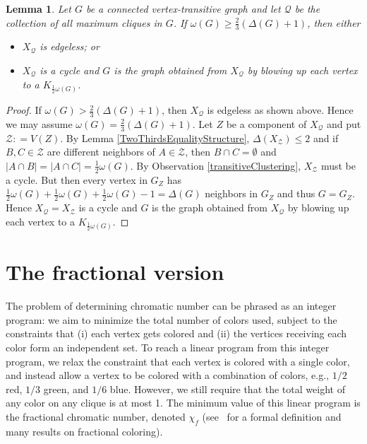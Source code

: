 \documentclass[12pt]{article}
\theoremstyle{plain}
\newtheorem{lem}[thm]{Lemma}
\theoremstyle{definition}
\theoremstyle{remark}
\newcommand{\fancy}[1]{\mathcal{#1}}
\newcommand{\card}[1]{\left|#1\right|}
\newcommand{\parens}[1]{\left( #1 \right)}
\newcommand{\DefinedAs}{\mathrel{\mathop:}=}
\def\Q{\fancy{Q}}
\def\Z{\fancy{Z}}
\begin{document}
\begin{lem}\label{TransitiveClusteringBigCliques}
Let $G$ be a connected vertex-transitive graph and let $\Q$ be the collection
of all maximum cliques in $G$.  If $\omega(G) \ge \frac23 \parens{\Delta(G) +
1}$, then either
\begin{itemize}
\item $X_\Q$ is edgeless; or
\item $X_\Q$ is a cycle and $G$ is the graph obtained from $X_\Q$ by blowing up each vertex to a $K_{\frac12 \omega(G)}$.
\end{itemize}
\end{lem}
\begin{proof}
If $\omega(G) > \frac23 \parens{\Delta(G) + 1}$, then $X_\Q$ is edgeless as shown above.  Hence we may assume $\omega(G) = \frac23 \parens{\Delta(G) + 1}$.  Let $Z$ be a component of $X_\Q$ and put $\Z \DefinedAs V(Z)$.
By Lemma \ref{TwoThirdsEqualityStructure}, $\Delta(X_\Z) \le 2$ and if $B, C \in \Z$ are different neighbors of $A \in \Z$, then $B \cap C = \emptyset$ and $\card{A \cap B} = \card{A \cap C} = \frac12 \omega(G)$.  By Observation \ref{transitiveClustering}, $X_\Z$ must be a cycle.  But then every vertex in $G_Z$ has $\frac12 \omega(G) + \frac12 \omega(G) + \frac12 \omega(G) - 1 = \Delta(G)$ neighbors in $G_Z$ and thus $G = G_Z$.  Hence $X_\Q = X_\Z$ is a cycle and $G$ is the graph obtained from $X_\Q$ by blowing up each vertex to a $K_{\frac12 \omega(G)}$.
\end{proof}

\section{The fractional version}
The problem of determining chromatic number can be phrased as an integer
program: we aim to minimize the total number of colors used, subject to the
constraints that (i) each vertex gets colored and (ii) the vertices receiving
each color form an independent set.  To reach a linear program from this
integer program, we relax the constraint that each vertex is colored with a
single color, and instead allow a vertex to be colored with a combination of
colors, e.g., $1/2$ red, $1/3$ green, and $1/6$ blue. However, we still
require that the total weight of any color on any clique is at most 1.
The minimum value of this linear program is the fractional chromatic number,
denoted $\chi_f$ (see~\cite{ScheinermanUllmanFrac} for a formal definition and
many results on fractional coloring).
\end{document}
